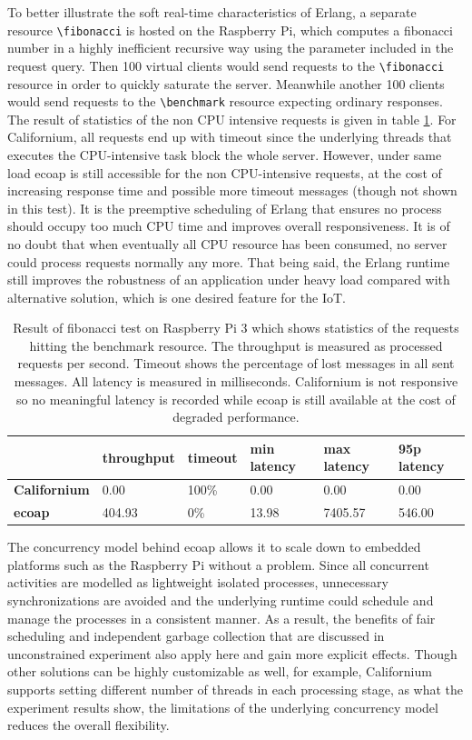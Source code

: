 To better illustrate the soft real-time characteristics of Erlang, a separate resource \verb|\fibonacci| is hosted on the Raspberry Pi, which computes a fibonacci number in a highly inefficient recursive way using the parameter included in the request query. Then 100 virtual clients would send requests to the \verb|\fibonacci| resource in order to quickly saturate the server. Meanwhile another 100 clients would send requests to the \verb|\benchmark| resource expecting ordinary responses. The result of statistics of the non CPU intensive requests is given in table \ref{tab:rasp_fib}. For Californium, all requests end up with timeout since the underlying threads that executes the CPU-intensive task block the whole server. However, under same load ecoap is still accessible for the non CPU-intensive requests, at the cost of increasing response time and possible more timeout messages (though not shown in this test). It is the preemptive scheduling of Erlang that ensures no process should occupy too much CPU time and improves overall responsiveness. It is of no doubt that when eventually all CPU resource has been consumed, no server could process requests normally any more. That being said, the Erlang runtime still improves the robustness of an application under heavy load compared with alternative solution, which is one desired feature for the IoT.

\begin{table}[!htbp]
\centering
\begin{tabular}{llllll}
%
 & \bfseries throughput &  \bfseries timeout & \bfseries min latency & \bfseries max latency & \bfseries 95p latency \\\hline
\bfseries Californium & 0.00 & 100\% & 0.00 & 0.00 & 0.00 \\\hline
\bfseries ecoap & 404.93 & 0\% & 13.98 & 7405.57 & 546.00\\
\end{tabular}
\caption[Result of fibonacci test on Raspberry Pi 3]{Result of fibonacci test on Raspberry Pi 3 which shows statistics of the requests hitting the benchmark resource. The throughput is measured as processed requests per second. Timeout shows the percentage of lost messages in all sent messages. All latency is measured in milliseconds. Californium is not responsive so no meaningful latency is recorded while ecoap is still available at the cost of degraded performance.}
\label{tab:rasp_fib}
\end{table}

The concurrency model behind ecoap allows it to scale down to embedded platforms such as the Raspberry Pi without a problem. Since all concurrent activities are modelled as lightweight isolated processes, unnecessary synchronizations are avoided and the underlying runtime could schedule and manage the processes in a consistent manner. As a result, the benefits of fair scheduling and independent garbage collection that are discussed in unconstrained experiment also apply here and gain more explicit effects. Though other solutions can be highly customizable as well, for example, Californium supports setting different number of threads in each processing stage, as what the experiment results show, the limitations of the underlying concurrency model reduces the overall flexibility. 

